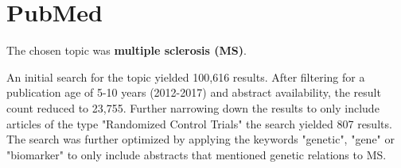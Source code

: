 \documentclass[12pt]{article}
\begin{document}
\maketitle

\section{PubMed}
The chosen topic was \textbf{multiple sclerosis (MS)}.

An initial search for the topic yielded 100,616 results.
After filtering for a publication age of 5-10 years (2012-2017) and 
abstract availability, the result count reduced to 23,755. Further
narrowing down the results to only include articles of the type "Randomized Control Trials"
the search yielded 807 results. The search was further optimized by applying the keywords "genetic", "gene" or "biomarker" to only include
abstracts that mentioned genetic relations to MS.
\end{document}

